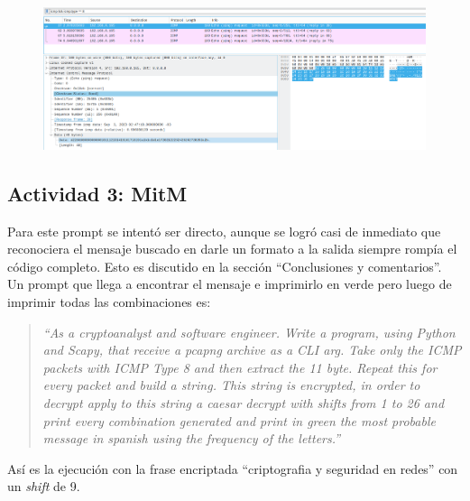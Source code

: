 \documentclass[letter,12pt]{article}
\newenvironment{itquote}
  {\begin{quote}\itshape}
  {\end{quote}\ignorespacesafterend}
\begin{document}
    \begin{figure}[H]
        \centering
        \includegraphics[width=16cm]{images/02-hola-msg-inside-icmp.png}
    \end{figure}

\subsection{Actividad 3: MitM}
Para este prompt se intentó ser directo, aunque se logró casi de inmediato que reconociera el mensaje buscado en darle un formato a la salida siempre rompía el código completo. Esto es discutido en la sección ``Conclusiones y comentarios''. Un prompt que llega a encontrar el mensaje e imprimirlo en verde pero luego de imprimir todas las combinaciones es:

\begin{itquote}
  ``As a cryptoanalyst and software engineer. Write a program, using Python and
Scapy, that receive a pcapng archive as a CLI arg. Take only the ICMP packets
with ICMP Type 8 and then extract the 11 byte. Repeat this for every packet and
build a string. This string is encrypted, in order to decrypt apply to this
string a caesar decrypt with shifts from 1 to 26 and print every combination
generated and print in green the most probable message in spanish using the
frequency of the letters.''
\end{itquote}

Así es la ejecución con la frase encriptada ``criptografia y seguridad en redes'' con un \textit{shift} de 9.
\end{document}
